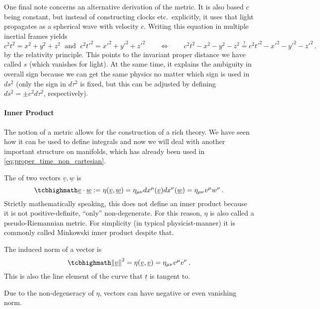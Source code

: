 One final note concerns an alternative derivation of the metric. It is also based $c$ being constant, but instead of constructing clocks etc.~explicitly, it uses that light propagates as a spherical wave with velocity $c$. Writing this equation in multiple inertial frames yields
\begin{equation}
	c^2 t^2 = x^2 + y^2 + z^2 \; \text{ and } \; c^2 t'^2 = x'^2 + y'^2 + z'^2 \qquad \Leftrightarrow \qquad c^2 t^2 - x^2 - y^2 - z^2 \overset{!}{=} c^2 t'^2 - x'^2 - y'^2 - z'^2 \, .
\end{equation}
by the relativity principle. This points to the invariant proper distance we have called $s$ (which vanishes for light). At the same time, it explains the ambiguity in overall sign because we can get the same physics no matter which sign is used in $ds^2$ (only the sign in $d\tau^2$ is fixed, but this can be adjusted by defining $ds^2 = \pm c^2 d\tau^2$, respectively).



		\paragraph{Inner Product}
The notion of a metric allows for the construction of a rich theory. We have seen how it can be used to define integrals and now we will deal with another important structure on manifolds, which has already been used in \eqref{eq:proper_time_non_cartesian}.

\begin{defi}
The  of two vectors $\underline{v}, \underline{w}$ is
\begin{equation}\label{eq:inner_prod}
	\eqbox{
	\underline{v} \cdot \underline{w} := \eta(\underline{v}, \underline{w}) = \eta_{\mu \nu} dx^\mu(\underline{v}) dx^\nu(\underline{w}) = \eta_{\mu \nu} v^\mu w^\nu
	} \, .
\end{equation}
Strictly mathematically speaking, this does not define an inner product because it is not positive-definite, \enquote{only} non-degenerate. For this reason, $\eta$ is also called a pseudo-Riemannian metric. For simplicity (in typical physicist-manner) it is commonly called Minkowski inner product despite that.


The induced norm of a vector is
\begin{equation}\label{eq:vector_norm}
	\eqbox{
	\norm{\underline{v}}^2 = \eta(\underline{v}, \underline{v}) = \eta_{\mu \nu} v^\mu v^\nu
	} \, .
\end{equation}
This is also the line element of the curve that $\underline{t}$ is tangent to.
\end{defi}
Due to the non-degeneracy of $\eta$, vectors can have negative or even vanishing norm.


